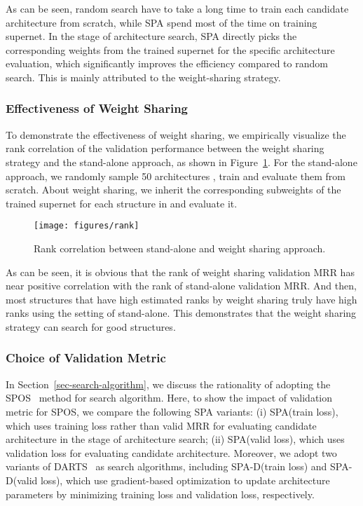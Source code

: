 \documentclass[11pt]{article}
\begin{document}
As can be seen,
random search have to take a long time 
to train each candidate architecture from scratch,
while SPA spend most of the time on training supernet.
In the stage of architecture search,
SPA directly picks the corresponding weights 
from the trained supernet 
for the specific architecture evaluation,
which significantly improves the efficiency compared to random search.
This is mainly attributed to the weight-sharing strategy.
\subsubsection{Effectiveness of Weight Sharing}

To demonstrate the effectiveness of weight sharing, 
we empirically visualize the rank correlation of the validation performance
between the weight sharing strategy
and the stand-alone approach,
as shown in Figure~\ref{fig-corr}. 
For the stand-alone approach,
we randomly sample 50 architectures , 
train and evaluate them from scratch.
About weight sharing,
we inherit the corresponding subweights of the trained supernet for each structure in  and evaluate it.

\begin{figure}[ht]
	\centering
	\texttt{[image: figures/rank]}
	\caption{Rank correlation between stand-alone and weight sharing approach.}
	\label{fig-corr}
	\vspace{-10px}
\end{figure}

As can be seen, 
it is obvious that 
the rank of weight sharing validation MRR 
has near positive correlation 
with the rank of stand-alone validation MRR.
And then, 
most structures that have high estimated ranks by weight sharing 
truly have high ranks 
using the setting of stand-alone.
This demonstrates that the weight sharing strategy can search for good structures.

\subsubsection{Choice of Validation Metric}

In Section~\ref{sec-search-algorithm}, 
we discuss the rationality of adopting the SPOS~\citep{guo2020single} method for search algorithm.
Here,
to show the impact of validation metric for SPOS, 
we compare the following SPA variants: 
(i) SPA(train loss), 
which uses training loss rather than valid MRR for evaluating candidate architecture in the stage of architecture search; 
(ii) SPA(valid loss), 
which uses validation loss for evaluating candidate architecture. 
Moreover, 
we adopt two variants of DARTS~\citep{liu2019darts} as search algorithms, 
including SPA-D(train loss) and SPA-D(valid loss), 
which use gradient-based optimization to update architecture parameters by minimizing training loss and validation loss, 
respectively.
\end{document}
